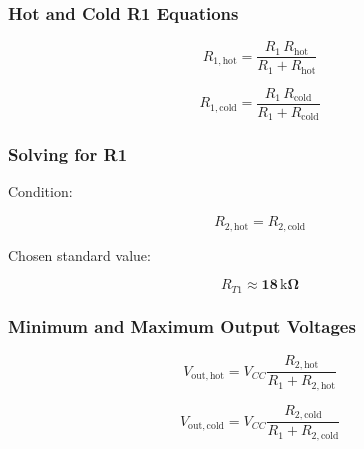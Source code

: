 \documentclass[12pt]{article}
\begin{document}
\subsubsection{Hot and Cold R1 Equations}

\begin{equation}
    R_{1,\mathrm{hot}}
    = \frac{R_1 \, R_{\mathrm{hot}}}{R_1 + R_{\mathrm{hot}}}
    \label{equ:R1_hot}
\end{equation}

\begin{equation}
    R_{1,\mathrm{cold}}
    = \frac{R_1 \, R_{\mathrm{cold}}}{R_1 + R_{\mathrm{cold}}}
    \label{equ:R1_cold}
\end{equation}

\subsubsection{Solving for R1}

Condition:

\begin{equation}
    R_{2,\mathrm{hot}} = R_{2,\mathrm{cold}}
    \label{equ:R2hot_equals_R2cold}
\end{equation}

Chosen standard value:

\begin{equation}
    R_{T1} \approx \mathbf{18\,\mathrm{k}\Omega}
    \label{equ:R1_18k}
\end{equation}

\subsubsection{Minimum and Maximum Output Voltages}

\begin{equation}
    V_{\mathrm{out,hot}}
    =
    V_{CC}
    \frac{R_{2,\mathrm{hot}}}{R_1 + R_{2,\mathrm{hot}}}
    \label{equ:Vout_hot}
\end{equation}

\begin{equation}
    V_{\mathrm{out,cold}}
    =
    V_{CC}
    \frac{R_{2,\mathrm{cold}}}{R_1 + R_{2,\mathrm{cold}}}
    \label{equ:Vout_cold}
\end{equation}
\end{document}
